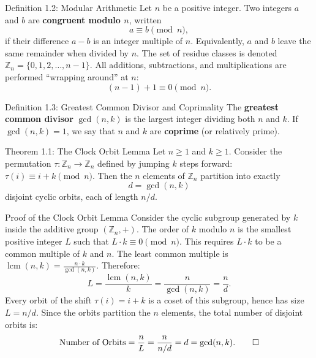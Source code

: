 \documentclass[11pt]{article}
\begin{document}
\begin{defbox}{Definition 1.2: Modular Arithmetic}
Let $n$ be a positive integer. Two integers $a$ and $b$ are \textbf{congruent modulo $n$}, written
\begin{equation}
  a \equiv b \pmod n,
\end{equation}
if their difference $a - b$ is an integer multiple of $n$. Equivalently, $a$ and $b$ leave the same remainder when divided by $n$.
The set of residue classes is denoted $\mathbb{Z}_n = \{0, 1, 2, \dots, n-1\}$. All additions, subtractions, and multiplications are performed ``wrapping around'' at $n$:
\begin{equation}
  (n-1) + 1 \equiv 0 \pmod n.
\end{equation}
\end{defbox}

\begin{defbox}{Definition 1.3: Greatest Common Divisor and Coprimality}
The \textbf{greatest common divisor} $\gcd(n, k)$ is the largest integer dividing both $n$ and $k$. If $\gcd(n, k) = 1$, we say that $n$ and $k$ are \textbf{coprime} (or relatively prime).
\end{defbox}

\begin{thmbox}{Theorem 1.1: The Clock Orbit Lemma}
Let $n \ge 1$ and $k \ge 1$. Consider the permutation $\tau: \mathbb{Z}_n \to \mathbb{Z}_n$ defined by jumping $k$ steps forward: $\tau(i) \equiv i + k \pmod n$. 
Then the $n$ elements of $\mathbb{Z}_n$ partition into exactly
\begin{equation}
  d = \gcd(n, k)
\end{equation}
disjoint cyclic orbits, each of length $n / d$.
\end{thmbox}

\begin{defbox}{Proof of the Clock Orbit Lemma}
Consider the cyclic subgroup generated by $k$ inside the additive group $(\mathbb{Z}_n, +)$. The order of $k$ modulo $n$ is the smallest positive integer $L$ such that $L \cdot k \equiv 0 \pmod n$. 
This requires $L \cdot k$ to be a common multiple of $k$ and $n$. The least common multiple is $\operatorname{lcm}(n, k) = \frac{n \cdot k}{\gcd(n, k)}$. Therefore:
\begin{equation}
  L = \frac{\operatorname{lcm}(n, k)}{k} = \frac{n}{\gcd(n, k)} = \frac{n}{d}.
\end{equation}
Every orbit of the shift $\tau(i) = i + k$ is a coset of this subgroup, hence has size $L = n/d$. Since the orbits partition the $n$ elements, the total number of disjoint orbits is:
\begin{equation}
  \text{Number of Orbits} = \frac{n}{L} = \frac{n}{n/d} = d = \gcd(n, k). \qedhere
\end{equation}
\end{defbox}
\end{document}
